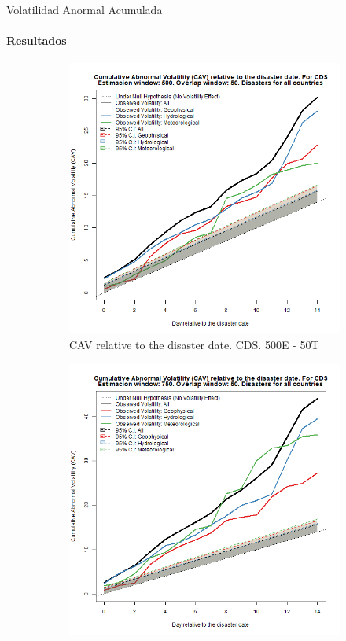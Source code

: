 \documentclass{beamer}
\begin{document}
\begin{frame}{Volatilidad Anormal Acumulada}
\framesubtitle{Resultados}
    \begin{figure}
    \begin{subfigure}{0.45\textwidth}
        \centering
        \includegraphics[width=\linewidth]{../Graficos_Paper/CAV/Ag//cds_PM_CAV_Est_500_tra_50.png}
        \caption{CAV relative to the disaster date. CDS. 500E - 50T}
        \label{figure:cavcds50050}
    \end{subfigure}
    \hfill
    \begin{subfigure}{0.45\textwidth}
        \centering
        \includegraphics[width=\linewidth]{../Graficos_Paper/CAV/Ag//cds_PM_CAV_Est_750_tra_50.png}

\end{subfigure}
\end{figure}
\end{frame}
\end{document}
